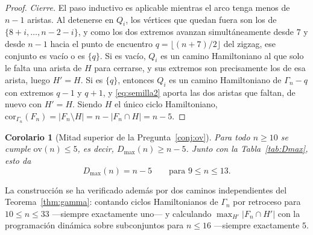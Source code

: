 \documentclass[11pt,a4paper]{article}
\newtheorem{corolario}[teorema]{Corolario}
\theoremstyle{definition}
\theoremstyle{remark}
\begin{document}
\begin{proof}
\emph{Cierre.} El paso inductivo es aplicable mientras el arco tenga menos de $n-1$ aristas. Al detenerse en $Q_i$, los vértices que quedan fuera son los de $\{8+i,\dots,n-2-i\}$, y como los dos extremos avanzan simultáneamente desde $7$ y desde $n-1$ hacia el punto de encuentro $q=\lfloor (n+7)/2\rfloor$ del zigzag, ese conjunto es vacío o es $\{q\}$. Si es vacío, $Q_i$ es un camino Hamiltoniano al que solo le falta una arista de $H$ para cerrarse, y sus extremos son precisamente los de esa arista, luego $H'=H$. Si es $\{q\}$, entonces $Q_i$ es un camino Hamiltoniano de $\Gamma_n-q$ con extremos $q-1$ y $q+1$, y \eqref{eq:semilla2} aporta las dos aristas que faltan, de nuevo con $H'=H$. Siendo $H$ el único ciclo Hamiltoniano, $\mathrm{cor}_{\Gamma_n}(F_n)=|F_n\setminus H|=n-|F_n\cap H|=n-5$.
\end{proof}

\begin{corolario}[Mitad superior de la Pregunta~\ref{conj:ov}]\label{cor:ovsup}
Para todo $n\ge10$ se cumple $\mathrm{ov}(n)\le5$, es decir, $D_{\max}(n)\ge n-5$. Junto con la Tabla~\ref{tab:Dmax}, esto da
\[
D_{\max}(n)=n-5\qquad\text{para }9\le n\le 13 .
\]
\end{corolario}

La construcción se ha verificado además por dos caminos independientes del Teorema~\ref{thm:gamma}: contando ciclos Hamiltonianos de $\Gamma_n$ por retroceso para $10\le n\le33$ —siempre exactamente uno— y calculando $\max_{H'}|F_n\cap H'|$ con la programación dinámica sobre subconjuntos para $n\le16$ —siempre exactamente $5$.
\end{document}
